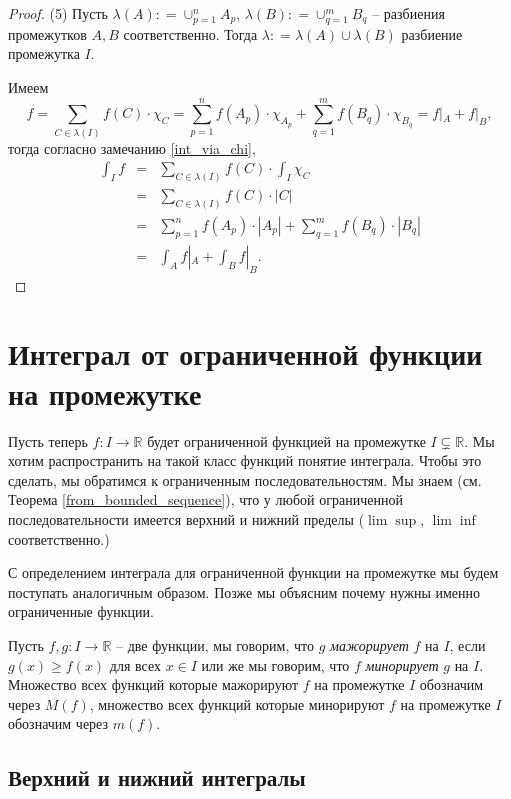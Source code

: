 \begin{proof}
(5) Пусть $\lambda(A): = \cup_{p=1}^n A_p$, $\lambda(B) : = \cup_{q=1}^m B_q$ -- разбиения промежутков $A,B$ соответственно. Тогда $\lambda : = \lambda(A) \cup \lambda(B)$ разбиение промежутка $I.$ 

Имеем
\[
  f = \sum_{C \in \lambda(I)} f(C) \cdot \chi_C = \sum_{p=1}^n f(A_p)\cdot \chi_{A_p} + \sum_{q=1}^m f(B_q)\cdot \chi_{B_q} = f|_A + f|_B,
\]
тогда согласно замечанию \ref{int_via_chi},
\begin{eqnarray*}
  \int_I f &=& \sum_{C \in \lambda(I)} f(C) \cdot \int_I \chi_C \\
  &=& \sum_{C \in \lambda(I)} f(C) \cdot |C| \\
  &=& \sum_{p=1}^n f(A_p) \cdot |A_p| + \sum_{q=1}^m f(B_q)\cdot |B_q| \\
  &=& \int_A f|_A + \int_B f|_B.
\end{eqnarray*}
\end{proof}



\section{Интеграл от ограниченной функции на промежутке}

Пусть теперь $f:I \to \mathbb{R}$ будет ограниченной функцией на промежутке $I\subsetneq \mathbb{R}$. Мы хотим распространить на такой класс функций понятие интеграла. Чтобы это сделать, мы обратимся к ограниченным последовательностям. Мы знаем (см. Теорема \ref{from_bounded_sequence}), что у любой ограниченной последовательности имеется верхний и нижний пределы ($\lim \sup$, $\lim \inf$ соответственно.) 

С определением интеграла для ограниченной функции на промежутке мы будем поступать аналогичным образом. Позже мы объясним почему нужны именно ограниченные функции.

\begin{definition}
    Пусть $f,g: I \to \mathbb{R}$ -- две функции, мы говорим, что $g$ \textit{мажорирует} $f$ на $I$, если $g(x) \ge f(x)$ для всех $x \in I$ или же мы говорим, что $f$ \textit{минорирует} $g$ на $I.$ Множество всех функций которые мажорируют $f$ на промежутке $I$ обозначим через $M(f)$, множество всех функций которые минорируют $f$ на промежутке $I$ обозначим через $m(f).$
\end{definition}


\subsection{Верхний и нижний интегралы}

